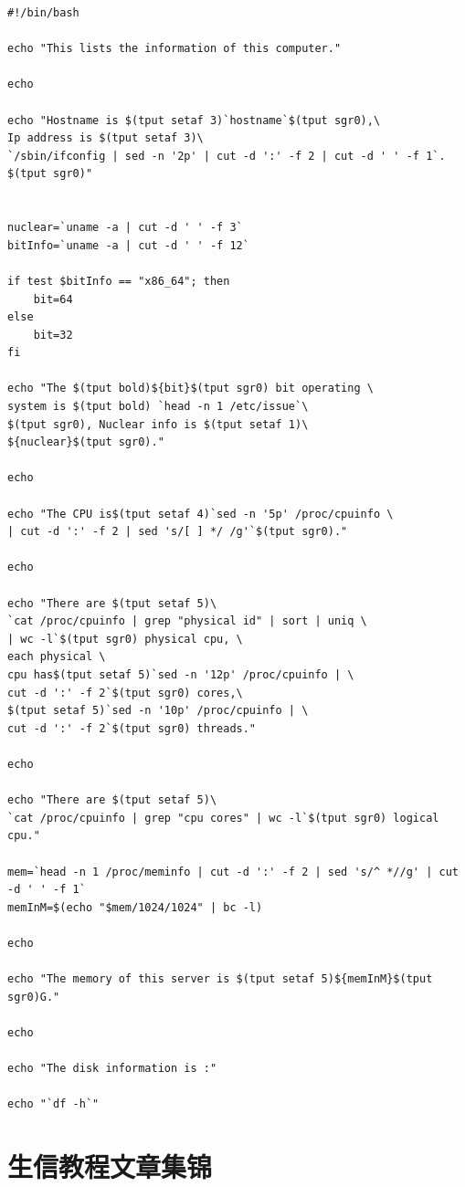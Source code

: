 \documentclass[]{article}
\numberwithin{figure}{section}
\numberwithin{table}{section}
\begin{document}
\begin{verbatim}
#!/bin/bash

echo "This lists the information of this computer."

echo

echo "Hostname is $(tput setaf 3)`hostname`$(tput sgr0),\
Ip address is $(tput setaf 3)\
`/sbin/ifconfig | sed -n '2p' | cut -d ':' -f 2 | cut -d ' ' -f 1`.
$(tput sgr0)"


nuclear=`uname -a | cut -d ' ' -f 3`
bitInfo=`uname -a | cut -d ' ' -f 12`

if test $bitInfo == "x86_64"; then
    bit=64
else
    bit=32
fi

echo "The $(tput bold)${bit}$(tput sgr0) bit operating \
system is $(tput bold) `head -n 1 /etc/issue`\
$(tput sgr0), Nuclear info is $(tput setaf 1)\
${nuclear}$(tput sgr0)."

echo

echo "The CPU is$(tput setaf 4)`sed -n '5p' /proc/cpuinfo \
| cut -d ':' -f 2 | sed 's/[ ] */ /g'`$(tput sgr0)."

echo

echo "There are $(tput setaf 5)\
`cat /proc/cpuinfo | grep "physical id" | sort | uniq \
| wc -l`$(tput sgr0) physical cpu, \
each physical \
cpu has$(tput setaf 5)`sed -n '12p' /proc/cpuinfo | \
cut -d ':' -f 2`$(tput sgr0) cores,\
$(tput setaf 5)`sed -n '10p' /proc/cpuinfo | \
cut -d ':' -f 2`$(tput sgr0) threads."

echo

echo "There are $(tput setaf 5)\
`cat /proc/cpuinfo | grep "cpu cores" | wc -l`$(tput sgr0) logical cpu."

mem=`head -n 1 /proc/meminfo | cut -d ':' -f 2 | sed 's/^ *//g' | cut -d ' ' -f 1`
memInM=$(echo "$mem/1024/1024" | bc -l)

echo

echo "The memory of this server is $(tput setaf 5)${memInM}$(tput sgr0)G."

echo

echo "The disk information is :"

echo "`df -h`"
\end{verbatim}

\hypertarget{ux751fux4fe1ux6559ux7a0bux6587ux7ae0ux96c6ux9526}{%
\section{生信教程文章集锦}\label{ux751fux4fe1ux6559ux7a0bux6587ux7ae0ux96c6ux9526}}
\end{document}
